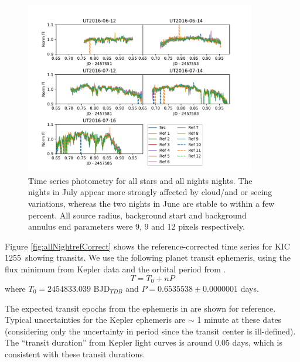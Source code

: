 \documentclass[twocolumn]{aastex61}
\newcommand{\shStar}{KIC 1255}
\begin{document}
\begin{figure}
\begin{centering}
\includegraphics[width=0.9\textwidth]{images/all_kic1255_phot/all_kic1255_allstar.pdf}
\caption{Time series photometry for all stars and all nights nights.
The nights in July appear more strongly affected by cloud/and or seeing variations, whereas the two nights in June are stable to within a few percent.
All source radius, background start and background annulus end parameters were 9, 9 and 12 pixels respectively.}\label{fig:allNightallStar}
\end{centering}
\end{figure}

Figure \ref{fig:allNightrefCorrect} shows the reference-corrected time series for \shStar\ showing transits.
We use the following planet transit ephemeris, using the flux minimum from Kepler data \citep{schlawin2016kic1255} and the orbital period from \citet{vanWerkhoven2014}.
\begin{equation}
T = T_0 + n P
\end{equation}
where $T_0 = 2454833.039$ BJD$_{TDB}$ and $P = 0.653 553 8 \pm 0.000 000 1$ days.

The expected transit epochs from the ephemeris in \citep{vanWerkhoven2014} are shown for reference.
Typical uncertainties for the Kepler ephemeris are $\sim$ 1 minute at these dates (considering only the uncertainty in period since the transit center is ill-defined).
The ``transit duration'' from Kepler light curves is around 0.05 days, which is consistent with these transit durations.
\end{document}
